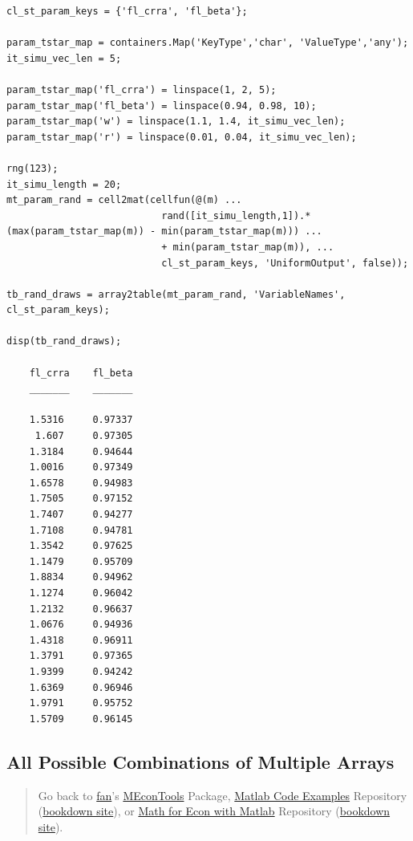 \documentclass[
]{book}
\begin{document}
\begin{verbatim}
cl_st_param_keys = {'fl_crra', 'fl_beta'};

param_tstar_map = containers.Map('KeyType','char', 'ValueType','any');
it_simu_vec_len = 5;

param_tstar_map('fl_crra') = linspace(1, 2, 5);
param_tstar_map('fl_beta') = linspace(0.94, 0.98, 10);
param_tstar_map('w') = linspace(1.1, 1.4, it_simu_vec_len);
param_tstar_map('r') = linspace(0.01, 0.04, it_simu_vec_len);

rng(123);
it_simu_length = 20;
mt_param_rand = cell2mat(cellfun(@(m) ...
                           rand([it_simu_length,1]).*(max(param_tstar_map(m)) - min(param_tstar_map(m))) ...
                           + min(param_tstar_map(m)), ...
                           cl_st_param_keys, 'UniformOutput', false));

tb_rand_draws = array2table(mt_param_rand, 'VariableNames', cl_st_param_keys);

disp(tb_rand_draws);

    fl_crra    fl_beta
    _______    _______

    1.5316     0.97337
     1.607     0.97305
    1.3184     0.94644
    1.0016     0.97349
    1.6578     0.94983
    1.7505     0.97152
    1.7407     0.94277
    1.7108     0.94781
    1.3542     0.97625
    1.1479     0.95709
    1.8834     0.94962
    1.1274     0.96042
    1.2132     0.96637
    1.0676     0.94936
    1.4318     0.96911
    1.3791     0.97365
    1.9399     0.94242
    1.6369     0.96946
    1.9791     0.95752
    1.5709     0.96145
\end{verbatim}

\hypertarget{all-possible-combinations-of-multiple-arrays}{%
\subsection{All Possible Combinations of Multiple Arrays}\label{all-possible-combinations-of-multiple-arrays}}

\begin{quote}
Go back to \href{http://fanwangecon.github.io/}{fan}'s \href{https://fanwangecon.github.io/MEconTools/}{MEconTools} Package, \href{https://fanwangecon.github.io/M4Econ/}{Matlab Code Examples} Repository (\href{https://fanwangecon.github.io/M4Econ/bookdown}{bookdown site}), or \href{https://fanwangecon.github.io/Math4Econ/}{Math for Econ with Matlab} Repository (\href{https://fanwangecon.github.io/Math4Econ/bookdown}{bookdown site}).
\end{quote}
\end{document}

